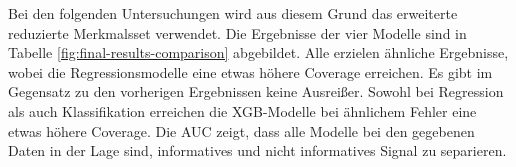 Bei den folgenden Untersuchungen wird aus diesem Grund das erweiterte reduzierte Merkmalsset verwendet. Die Ergebnisse der vier Modelle sind in Tabelle \ref{fig:final-results-comparison} abgebildet. Alle erzielen ähnliche Ergebnisse, wobei die Regressionsmodelle eine etwas höhere Coverage erreichen. Es gibt im Gegensatz zu den vorherigen Ergebnissen keine Ausreißer. Sowohl bei Regression als auch Klassifikation erreichen die \ac{XGB}-Modelle bei ähnlichem Fehler eine etwas höhere Coverage. Die \ac{AUC} zeigt, dass alle Modelle bei den gegebenen Daten in der Lage sind, informatives und nicht informatives Signal zu separieren.

